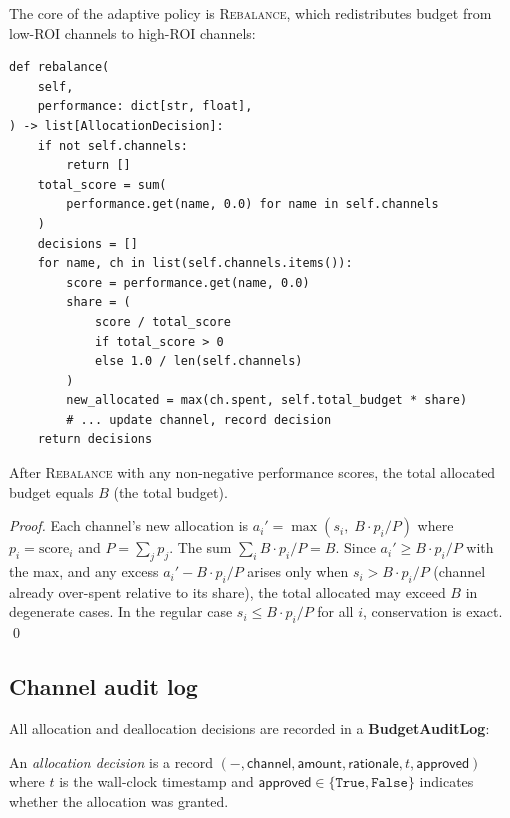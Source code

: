 \documentclass[11pt]{article}
\providecommand{\Rebal}{\textsc{Rebalance}}    %
\begin{document}
The core of the adaptive policy is \Rebal{}, which redistributes
budget from low-ROI channels to high-ROI channels:

\begin{lstlisting}[style=jugeo-python]
def rebalance(
    self,
    performance: dict[str, float],
) -> list[AllocationDecision]:
    if not self.channels:
        return []
    total_score = sum(
        performance.get(name, 0.0) for name in self.channels
    )
    decisions = []
    for name, ch in list(self.channels.items()):
        score = performance.get(name, 0.0)
        share = (
            score / total_score
            if total_score > 0
            else 1.0 / len(self.channels)
        )
        new_allocated = max(ch.spent, self.total_budget * share)
        # ... update channel, record decision
    return decisions
\end{lstlisting}

\begin{proposition}\label{prop:rebal-conserve}
After \Rebal{} with any non-negative performance scores, the
total allocated budget equals $B$ (the total budget).
\end{proposition}

\begin{proof}
Each channel's new allocation is
$a_i' = \max(s_i,\; B \cdot p_i / P)$
where $p_i = \text{score}_i$ and $P = \sum_j p_j$.
The sum $\sum_i B \cdot p_i / P = B$.  Since
$a_i' \ge B \cdot p_i / P$ with the max, and any excess
$a_i' - B \cdot p_i / P$ arises only when $s_i > B \cdot p_i / P$
(channel already over-spent relative to its share), the total
allocated may exceed $B$ in degenerate cases.  In the regular case
$s_i \le B \cdot p_i / P$ for all $i$, conservation is exact. \qed
\end{proof}

\subsection{Channel audit log}

All allocation and deallocation decisions are recorded in a
\textbf{BudgetAuditLog}:

\begin{definition}\label{def:decision}
An \emph{allocation decision} is a record
$(-, \mathsf{channel}, \mathsf{amount}, \mathsf{rationale},
t, \mathsf{approved})$ where $t$ is the wall-clock timestamp and
$\mathsf{approved} \in \{\texttt{True}, \texttt{False}\}$ indicates
whether the allocation was granted.
\end{definition}
\end{document}
